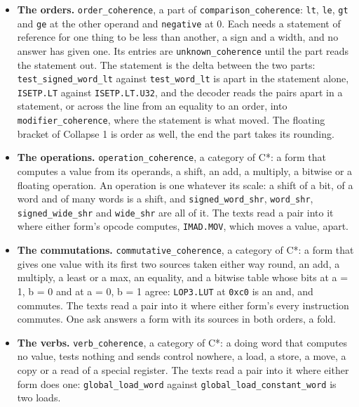 \begin{itemize}
\item \textbf{The orders.} \texttt{order\_\allowbreak{}coherence}, a part of \texttt{comparison\_\allowbreak{}coherence}: \texttt{lt}, \texttt{le}, \texttt{gt} and \texttt{ge} at the other operand and \texttt{negative} at 0. Each needs a statement of reference for one thing to be less than another, a sign and a width, and no answer has given one. Its entries are \texttt{unknown\_\allowbreak{}coherence} until the part reads the statement out. The statement is the delta between the two parts: \texttt{test\_\allowbreak{}signed\_\allowbreak{}word\_\allowbreak{}lt} against \texttt{test\_\allowbreak{}word\_\allowbreak{}lt} is apart in the statement alone, \texttt{ISETP.\allowbreak{}LT} against \texttt{ISETP.\allowbreak{}LT.\allowbreak{}U32}, and the decoder reads the pairs apart in a statement, or across the line from an equality to an order, into \texttt{modifier\_\allowbreak{}coherence}, where the statement is what moved. The floating bracket of Collapse 1 is order as well, the end the part takes its rounding.
\item \textbf{The operations.} \texttt{operation\_\allowbreak{}coherence}, a category of C*: a form that computes a value from its operands, a shift, an add, a multiply, a bitwise or a floating operation. An operation is one whatever its scale: a shift of a bit, of a word and of many words is a shift, and \texttt{signed\_\allowbreak{}word\_\allowbreak{}shr}, \texttt{word\_\allowbreak{}shr}, \texttt{signed\_\allowbreak{}wide\_\allowbreak{}shr} and \texttt{wide\_\allowbreak{}shr} are all of it. The texts read a pair into it where either form's opcode computes, \texttt{IMAD.\allowbreak{}MOV}, which moves a value, apart.
\item \textbf{The commutations.} \texttt{commutative\_\allowbreak{}coherence}, a category of C*: a form that gives one value with its first two sources taken either way round, an add, a multiply, a least or a max, an equality, and a bitwise table whose bits at a = 1, b = 0 and at a = 0, b = 1 agree: \texttt{LOP3.\allowbreak{}LUT} at \texttt{0xc0} is an and, and commutes. The texts read a pair into it where either form's every instruction commutes. One ask answers a form with its sources in both orders, a fold.
\item \textbf{The verbs.} \texttt{verb\_\allowbreak{}coherence}, a category of C*: a doing word that computes no value, tests nothing and sends control nowhere, a load, a store, a move, a copy or a read of a special register. The texts read a pair into it where either form does one: \texttt{global\_\allowbreak{}load\_\allowbreak{}word} against \texttt{global\_\allowbreak{}load\_\allowbreak{}constant\_\allowbreak{}word} is two loads.

\end{itemize}
